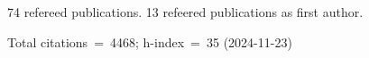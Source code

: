74 refereed publications. 13 refeered publications as first author.

Total citations~=~4468; h-index~=~35 (2024-11-23)